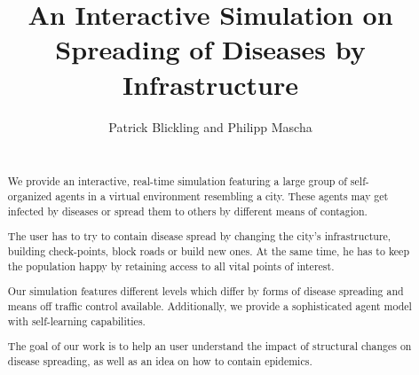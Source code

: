 \documentclass[table]{sig-alternate-05-2015}
\begin{document}


%
%
%

%

\title{An Interactive Simulation on Spreading of Diseases by Infrastructure}


\author{

\alignauthor
Patrick Blickling and Philipp Mascha\\
       \\
       }


\maketitle


\begin{abstract}
We provide an interactive, real-time simulation featuring a large group of self-organized agents in a virtual environment resembling a city. These agents may get infected by diseases or spread them to others by different means of contagion.

The user has to try to contain disease spread by changing the city's infrastructure, building check-points, block roads or build new ones. At the same time, he has to keep the population happy by retaining access to all vital points of interest.

Our simulation features different levels which differ by forms of disease spreading and means off traffic control available. Additionally, we provide a sophisticated agent model with self-learning capabilities.

The goal of our work is to help an user understand the impact of structural changes on disease spreading, as well as an idea on how to contain epidemics.
\end{abstract}
\end{document}
